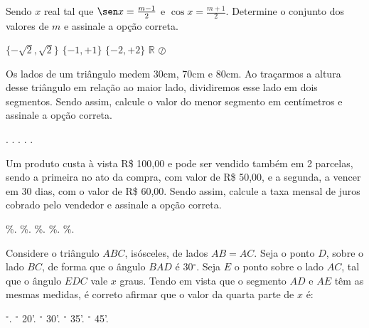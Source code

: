 \begin{question}%
Sendo \(x\) real tal que \(\sen x = \frac{m-1}{2}\) e \(\cos x = \frac{m+1}{2}\). Determine o conjunto dos valores de \(m\) e assinale a opção correta.
    \begin{tasks}
        \task \(\{-\sqrt{2},\sqrt{2}\}\)
        \task \(\{-1,+1\}\)
        \task \(\{-2,+2\}\)
        \task \(\mathbb{R}\)
        \task \(\oslash\)
    \end{tasks}
\end{question}

\begin{question}%
Os lados de um triângulo medem 30cm, 70cm e 80cm. Ao traçarmos a altura desse triângulo em relação ao maior lado, dividiremos esse lado em dois segmentos. Sendo assim, calcule o valor do menor segmento em centímetros e assinale a opção correta.
    \begin{tasks}
        .
        .
        .
        .
        .
    \end{tasks}
\end{question}

\begin{question}%
Um produto custa à vista R\$ 100,00 e pode ser vendido também em 2 parcelas, sendo a primeira no ato da compra, com valor de R\$ 50,00, e a segunda, a vencer em 30 dias, com o valor de R\$ 60,00. Sendo assim, calcule a taxa mensal de juros cobrado pelo vendedor e assinale a opção correta.
    \begin{tasks}
        \%.
        \%.
        \%.
        \%.
        \%.
    \end{tasks}
\end{question}

\begin{question}%
Considere o triângulo \(ABC\), isósceles, de lados \(AB=AC\). Seja o ponto \(D\), sobre o lado \(BC\), de forma que o ângulo \(BAD\) é 30\(^\circ\). Seja \(E\) o ponto sobre o lado \(AC\), tal que o ângulo \(EDC\) vale \(x\) graus. Tendo em vista que o segmento \(AD\) e \(AE\) têm as mesmas medidas, é correto afirmar que o valor da quarta parte de \(x\) é:
    \begin{tasks}
        \(^\circ\).
        \(^\circ\) 20'.
        \(^\circ\) 30'.
        \(^\circ\) 35'.
        \(^\circ\) 45'.
    \end{tasks}
\end{question}

